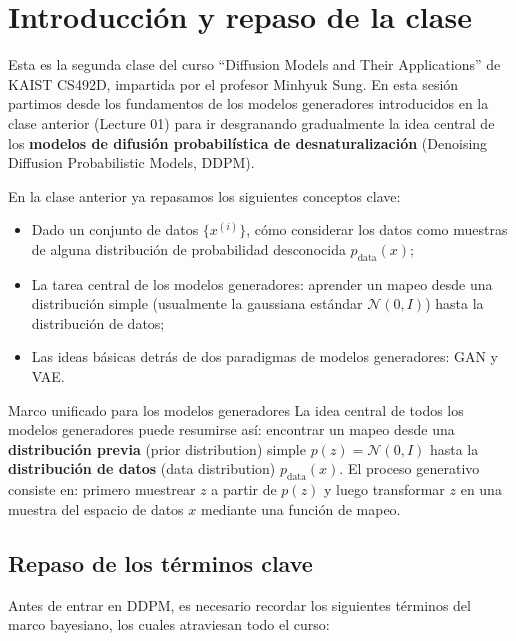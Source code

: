 \section{Introducción y repaso de la clase}

Esta es la segunda clase del curso ``Diffusion Models and Their Applications'' de KAIST CS492D, impartida por el profesor Minhyuk Sung. En esta sesión partimos desde los fundamentos de los modelos generadores introducidos en la clase anterior (Lecture 01) para ir desgranando gradualmente la idea central de los \textbf{modelos de difusión probabilística de desnaturalización} (Denoising Diffusion Probabilistic Models, DDPM).

En la clase anterior ya repasamos los siguientes conceptos clave:
\begin{itemize}
    \item Dado un conjunto de datos $\{x^{(i)}\}$, cómo considerar los datos como muestras de alguna distribución de probabilidad desconocida $p_{\text{data}}(x)$;
    \item La tarea central de los modelos generadores: aprender un mapeo desde una distribución simple (usualmente la gaussiana estándar $\mathcal{N}(0, I)$) hasta la distribución de datos;
    \item Las ideas básicas detrás de dos paradigmas de modelos generadores: GAN y VAE.
\end{itemize}

\begin{knowledgebox}{Marco unificado para los modelos generadores}
La idea central de todos los modelos generadores puede resumirse así: encontrar un mapeo desde una \textbf{distribución previa} (prior distribution) simple $p(z) = \mathcal{N}(0, I)$ hasta la \textbf{distribución de datos} (data distribution) $p_{\text{data}}(x)$. El proceso generativo consiste en: primero muestrear $z$ a partir de $p(z)$ y luego transformar $z$ en una muestra del espacio de datos $x$ mediante una función de mapeo.
\end{knowledgebox}

\subsection{Repaso de los términos clave}

Antes de entrar en DDPM, es necesario recordar los siguientes términos del marco bayesiano, los cuales atraviesan todo el curso:

